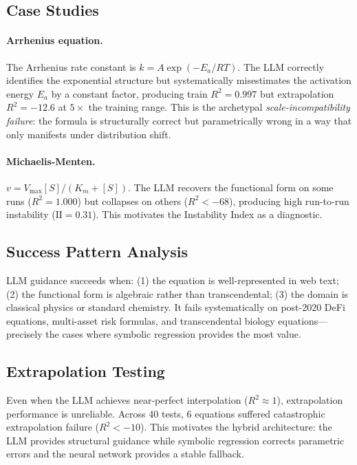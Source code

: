 \documentclass[twoside,11pt]{article}
\newcommand{\Rsq}{R^{2}}
\newcommand{\II}{\mathrm{II}}
\begin{document}
\subsection{Case Studies}
\label{sec:llm_cases}

\paragraph{Arrhenius equation.}
The Arrhenius rate constant is $k = A \exp\!(-E_a/RT)$. The LLM correctly identifies the exponential structure but systematically misestimates the activation energy $E_a$ by a constant factor, producing train $\Rsq = 0.997$ but extrapolation $\Rsq = -12.6$ at $5\times$ the training range. This is the archetypal \emph{scale-incompatibility failure}: the formula is structurally correct but parametrically wrong in a way that only manifests under distribution shift.

\paragraph{Michaelis-Menten.}
$v = V_{\max}[S]/(K_m + [S])$. The LLM recovers the functional form on some runs ($\Rsq = 1.000$) but collapses on others ($\Rsq < -68$), producing high run-to-run instability ($\II = 0.31$). This motivates the Instability Index as a diagnostic.

\subsection{Success Pattern Analysis}
\label{sec:llm_success}

LLM guidance succeeds when: (1) the equation is well-represented in web text; (2) the functional form is algebraic rather than transcendental; (3) the domain is classical physics or standard chemistry. It fails systematically on post-2020 DeFi equations, multi-asset risk formulas, and transcendental biology equations---precisely the cases where symbolic regression provides the most value.

\subsection{Extrapolation Testing}
\label{sec:llm_extrap}

Even when the LLM achieves near-perfect interpolation ($\Rsq \approx 1$), extrapolation performance is unreliable. Across 40 tests, 6 equations suffered catastrophic extrapolation failure ($\Rsq < -10$). This motivates the hybrid architecture: the LLM provides structural guidance while symbolic regression corrects parametric errors and the neural network provides a stable fallback.
\end{document}
